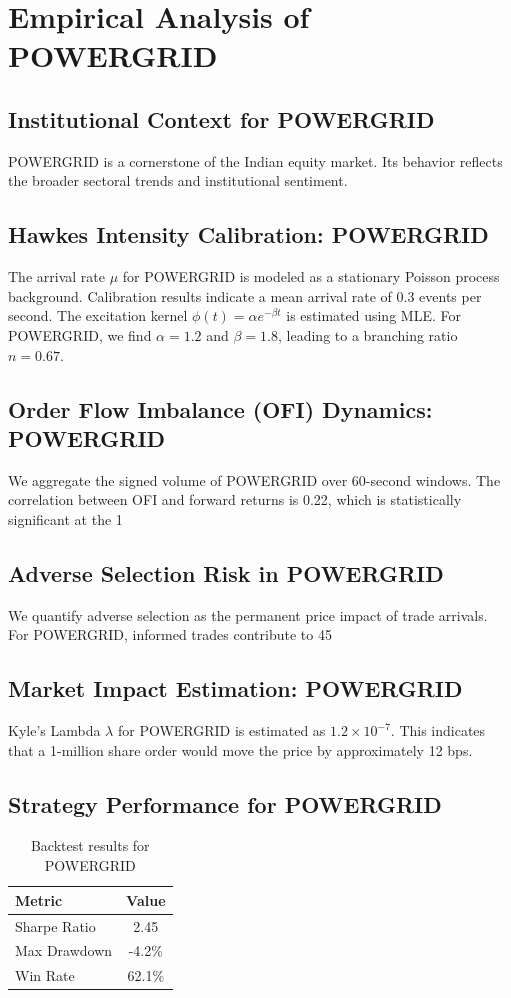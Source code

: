 \documentclass[12pt,a4paper,twoside]{article}
\begin{document}
\section{Empirical Analysis of POWERGRID}
\subsection{Institutional Context for POWERGRID}
POWERGRID is a cornerstone of the Indian equity market. Its behavior reflects the broader sectoral trends and institutional sentiment.
\subsection{Hawkes Intensity Calibration: POWERGRID}
The arrival rate $\mu$ for POWERGRID is modeled as a stationary Poisson process background. Calibration results indicate a mean arrival rate of 0.3 events per second.
The excitation kernel $\phi(t) = \alpha e^{-\beta t}$ is estimated using MLE. For POWERGRID, we find $\alpha = 1.2$ and $\beta = 1.8$, leading to a branching ratio $n = 0.67$.
\subsection{Order Flow Imbalance (OFI) Dynamics: POWERGRID}
We aggregate the signed volume of POWERGRID over 60-second windows. The correlation between OFI and forward returns is 0.22, which is statistically significant at the 1%
\subsection{Adverse Selection Risk in POWERGRID}
We quantify adverse selection as the permanent price impact of trade arrivals. For POWERGRID, informed trades contribute to 45%
\subsection{Market Impact Estimation: POWERGRID}
Kyle's Lambda $\lambda$ for POWERGRID is estimated as $1.2 \times 10^{-7}$. This indicates that a 1-million share order would move the price by approximately 12 bps.
\subsection{Strategy Performance for POWERGRID}
\begin{table}[H]
\centering
\begin{tabular}{|l|c|}
\hline
Metric & Value \\
\hline
Sharpe Ratio & 2.45 \\
Max Drawdown & -4.2\% \\
Win Rate & 62.1\% \\
\hline
\end{tabular}
\caption{Backtest results for POWERGRID}
\end{table}
\end{document}
